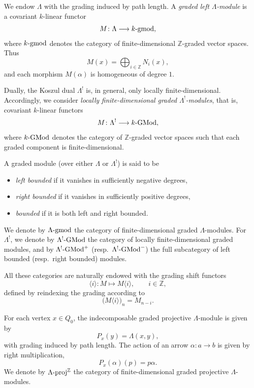 \documentclass[11pt]{article}
\theoremstyle{definition}
\theoremstyle{remark}
\begin{document}
\medskip

We endow \(\Lambda\) with the grading induced by path length. A \emph{graded left \(\Lambda\)-module} is a covariant \(k\)-linear functor
\[
M \colon \Lambda \longrightarrow k\textup{-gmod},
\]
where \(k\textup{-gmod}\) denotes the category of finite-dimensional \(\mathbb{Z}\)-graded vector spaces. Thus
\[
M(x)=\bigoplus_{i\in\mathbb{Z}} N_i(x),
\]
and each morphism \(M(\alpha)\) is homogeneous of degree \(1\).

\medskip

Dually, the Koszul dual \(\Lambda^{!}\) is, in general, only locally finite-dimensional. Accordingly, we consider \emph{locally finite-dimensional graded \(\Lambda^{!}\)-modules}, that is, covariant \(k\)-linear functors
\[
M \colon \Lambda^{!} \longrightarrow k\textup{-GMod},
\]
where \(k\textup{-GMod}\) denotes the category of \(\mathbb{Z}\)-graded vector spaces such that each graded component is finite-dimensional.

\medskip

A graded module (over either \(\Lambda\) or \(\Lambda^{!}\)) is said to be
\begin{itemize}
\item \emph{left bounded} if it vanishes in sufficiently negative degrees,
\item \emph{right bounded} if it vanishes in sufficiently positive degrees,
\item \emph{bounded} if it is both left and right bounded.
\end{itemize}

\medskip

We denote by \(\Lambda\textup{-gmod}\) the category of finite-dimensional graded \(\Lambda\)-modules. For \(\Lambda^{!}\), we denote by \(\Lambda^{!}\textup{-GMod}\) the category of locally finite-dimensional graded modules, and by \(\Lambda^{!}\textup{-GMod}^{+}\) (resp.\ \(\Lambda^{!}\textup{-GMod}^{-}\)) the full subcategory of left bounded (resp.\ right bounded) modules.

\medskip

All these categories are naturally endowed with the grading shift functors
\[
\langle i\rangle \colon M \longmapsto M\langle i\rangle,
\qquad i \in \mathbb{Z},
\]
defined by reindexing the grading according to
\[
\bigl(M\langle i\rangle\bigr)_{n} = M_{n-i}.
\]

\medskip

For each vertex \(x\in Q_{0}\), the indecomposable graded projective \(\Lambda\)-module is given by
\[
P_{x}(y)=\Lambda(x,y),
\]
with grading induced by path length. The action of an arrow \(\alpha\colon a\to b\) is given by right multiplication,
\[
P_{x}(\alpha)(p)=p\alpha.
\]
We denote by \(\Lambda\textup{-proj}^{\mathbb{Z}}\) the category of finite-dimensional graded projective \(\Lambda\)-modules.
\end{document}
